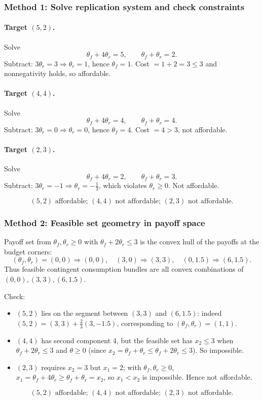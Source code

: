 \documentclass[12pt]{article}
\begin{document}
\subsubsection*{Method 1: Solve replication system and check constraints}
\paragraph{Target \((5,2)\).}
Solve
\[
\theta_f+4\theta_r=5,\qquad \theta_f+\theta_r=2.
\]
Subtract: \(3\theta_r=3\Rightarrow \theta_r=1\), hence \(\theta_f=1\).
Cost \(=1+2=3\le 3\) and nonnegativity holds, so affordable.

\paragraph{Target \((4,4)\).}
Solve
\[
\theta_f+4\theta_r=4,\qquad \theta_f+\theta_r=4.
\]
Subtract: \(3\theta_r=0\Rightarrow \theta_r=0\), hence \(\theta_f=4\).
Cost \(=4>3\), not affordable.

\paragraph{Target \((2,3)\).}
Solve
\[
\theta_f+4\theta_r=2,\qquad \theta_f+\theta_r=3.
\]
Subtract: \(3\theta_r=-1\Rightarrow \theta_r=-\frac{1}{3}\), which violates \(\theta_r\ge 0\). Not affordable.

\[
\boxed{\;(5,2)\text{ affordable; }(4,4)\text{ not affordable; }(2,3)\text{ not affordable.}\;}
\]

\subsubsection*{Method 2: Feasible set geometry in payoff space}
Payoff set from \(\theta_f,\theta_r\ge 0\) with \(\theta_f+2\theta_r\le 3\) is the convex hull of the payoffs at the budget corners:
\[
(\theta_f,\theta_r)=(0,0)\Rightarrow (0,0),
\quad
(3,0)\Rightarrow (3,3),
\quad
(0,1.5)\Rightarrow (6,1.5).
\]
Thus feasible contingent consumption bundles are all convex combinations of \((0,0),(3,3),(6,1.5)\).

Check:
\begin{itemize}[leftmargin=*]
\item \((5,2)\) lies on the segment between \((3,3)\) and \((6,1.5)\): indeed \((5,2)=(3,3)+\frac{2}{3}(3,-1.5)\), corresponding to \((\theta_f,\theta_r)=(1,1)\).
\item \((4,4)\) has second component 4, but the feasible set has \(x_2\le 3\) when \(\theta_f+2\theta_r\le 3\) and \(\theta\ge 0\) (since \(x_2=\theta_f+\theta_r\le \theta_f+2\theta_r\le 3\)). So impossible.
\item \((2,3)\) requires \(x_2=3\) but \(x_1=2\); with \(\theta_f,\theta_r\ge 0\), \(x_1=\theta_f+4\theta_r\ge \theta_f+\theta_r=x_2\), so \(x_1<x_2\) is impossible. Hence not affordable.
\end{itemize}
\[
\boxed{\;(5,2)\text{ affordable; }(4,4)\text{ not affordable; }(2,3)\text{ not affordable.}\;}
\]
\end{document}
